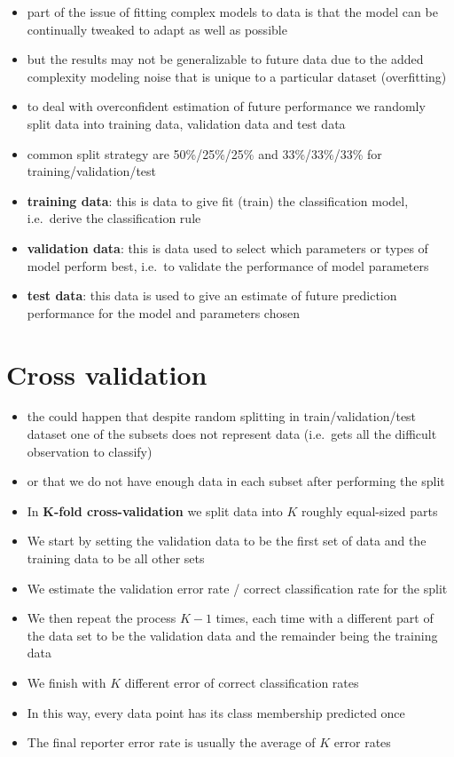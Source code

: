 \documentclass[
]{book}
\providecommand{\tightlist}{%
  \setlength{\itemsep}{0pt}\setlength{\parskip}{0pt}}
\theoremstyle{definition}
\theoremstyle{definition}
\theoremstyle{definition}
\theoremstyle{remark}
\begin{document}
\begin{itemize}
\tightlist
\item
  part of the issue of fitting complex models to data is that the model can be continually tweaked to adapt as well as possible
\item
  but the results may not be generalizable to future data due to the added complexity modeling noise that is unique to a particular dataset (overfitting)
\item
  to deal with overconfident estimation of future performance we randomly split data into training data, validation data and test data
\item
  common split strategy are 50\%/25\%/25\% and 33\%/33\%/33\% for training/validation/test
\item
  \textbf{training data}: this is data to give fit (train) the classification model, i.e.~derive the classification rule
\item
  \textbf{validation data}: this is data used to select which parameters or types of model perform best, i.e.~to validate the performance of model parameters
\item
  \textbf{test data}: this data is used to give an estimate of future prediction performance for the model and parameters chosen
\end{itemize}

\hypertarget{cross-validation}{%
\section{Cross validation}\label{cross-validation}}

\begin{itemize}
\tightlist
\item
  the could happen that despite random splitting in train/validation/test dataset one of the subsets does not represent data (i.e.~gets all the difficult observation to classify)
\item
  or that we do not have enough data in each subset after performing the split
\item
  In \textbf{K-fold cross-validation} we split data into \(K\) roughly equal-sized parts
\item
  We start by setting the validation data to be the first set of data and the training data to be all other sets
\item
  We estimate the validation error rate / correct classification rate for the split
\item
  We then repeat the process \(K-1\) times, each time with a different part of the data set to be the validation data and the remainder being the training data
\item
  We finish with \(K\) different error of correct classification rates
\item
  In this way, every data point has its class membership predicted once
\item
  The final reporter error rate is usually the average of \(K\) error rates
\end{itemize}
\end{document}
